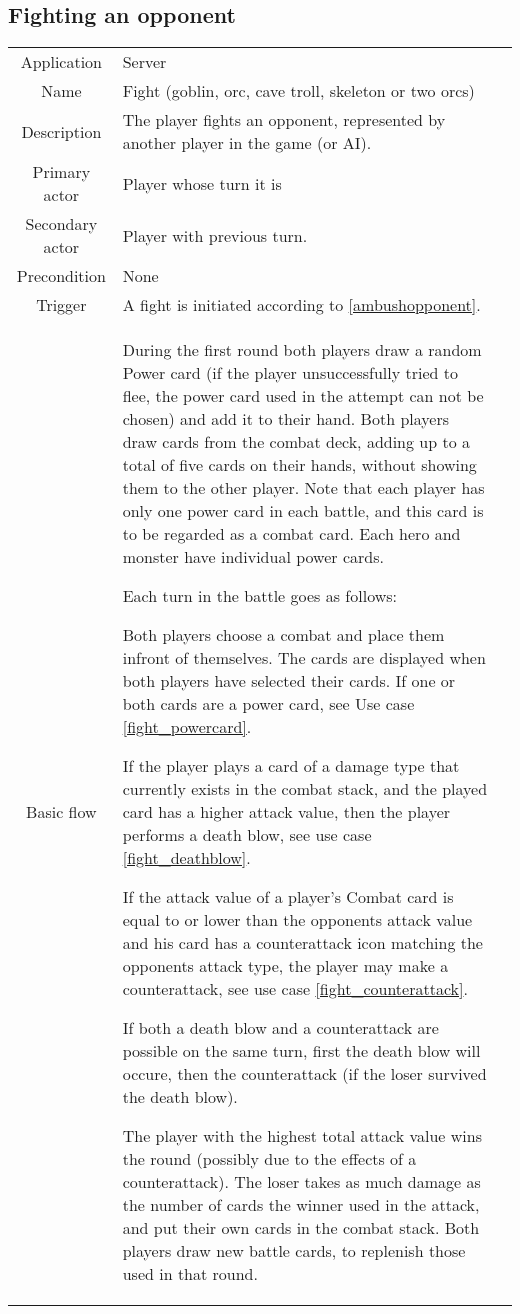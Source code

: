 \subsection{Fighting an opponent}
\label{fightopponent}
\begin{tabular}{|c| p{9cm}|c}
\hline
Application & Server \\
Name & Fight (goblin, orc, cave troll, skeleton or two orcs) \\
Description & The player fights an opponent, represented by another player in the game (or AI). \\
Primary actor & Player whose turn it is \\
Secondary actor & Player with previous turn. \\
Precondition & None \\
Trigger & A fight is initiated according to \ref{ambushopponent}. \\ \hline
Basic flow & During the first round both players draw a random Power card (if the player unsuccessfully tried to flee, the power card used in the attempt can not be chosen) and add it to their hand. Both players draw cards from the combat deck, adding up to a total of five cards on their hands, without showing them to the other player. Note that each player has only one power card in each battle, and this card is to be regarded as a combat card. Each hero and monster have individual power cards.

Each turn in the battle goes as follows:

Both players choose a combat and place them infront of themselves. The cards are displayed when both players have selected their cards. If one or both cards are a power card, see Use case \ref{fight_powercard}.

If the player plays a card of a damage type that currently exists in the combat stack, and the played card has a higher attack value, then the player performs a death blow, see use case \ref{fight_deathblow}.

If the attack value of a player's Combat card is equal to or lower than the opponents attack value and his card has a counterattack icon matching the opponents attack type, the player may make a counterattack, see use case \ref{fight_counterattack}.

If both a death blow and a counterattack are possible on the same turn, first the death blow will occure, then the counterattack (if the loser survived the death blow).

The player with the highest total attack value wins the round (possibly due to the effects of a counterattack). The loser takes as much damage as the number of cards the winner used in the attack, and put their own cards in the combat stack. Both players draw new battle cards, to replenish those used in that round.


\end{tabular}
